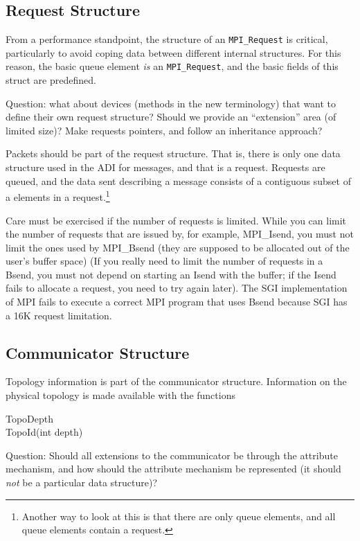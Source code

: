 \documentclass{article}
\begin{document}
\subsection{Request Structure}
From a performance standpoint, the structure of an \texttt{MPI\_Request} is
critical, particularly to avoid coping data between different internal
structures.  For this reason, the basic queue element \emph{is} an
\texttt{MPI\_Request}, and the basic fields of this struct are predefined.

Question: what about devices (methods in the new terminology) that want to
define their own request structure? 
Should we provide an ``extension'' area (of limited size)?  Make requests
pointers, and follow an inheritance approach?  

Packets should be part of the request structure.  That is, there is only one
data structure used in the ADI for messages, and that is a request.  Requests
are queued, and the data sent describing a message consists of a contiguous
subset of a elements in a request.\footnote{Another way to look at this is
  that there are only queue elements, and all queue elements contain a
  request.} 

Care must be exercised if the number of requests is limited.
While you can limit
the number of requests that are issued by, for example, MPI\_Isend, you must
not limit the ones used by MPI\_Bsend (they are supposed to be allocated out
of the user's buffer space) (If you really need to limit the number of
requests in a Bsend, you must not depend on starting an Isend with the buffer;
if the Isend fails to allocate a request, you need to try again later).  The
SGI implementation of MPI fails to execute a correct MPI program that uses
Bsend because SGI has a 16K request limitation.

\subsection{Communicator Structure}

Topology information is part of the communicator structure.
Information on the physical topology is made available with the functions
\begin{description}
\item[TopoDepth]
\item[TopoId(int depth)]
\end{description}

Question: Should all extensions to the communicator be through the attribute
mechanism, and how should the attribute mechanism be represented (it should
\emph{not} be a particular data structure)?
\end{document}
